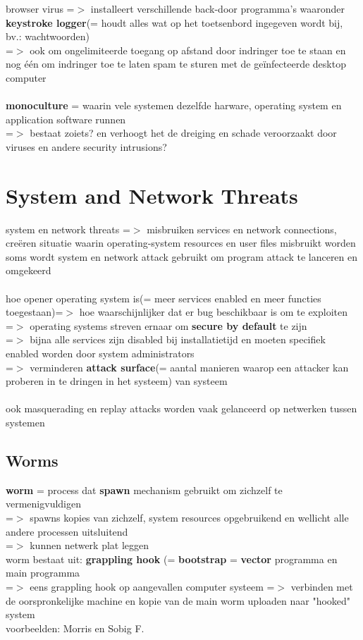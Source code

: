 \documentclass{report}
\begin{document}
browser virus =$>$ installeert verschillende back-door programma's waaronder \textbf{keystroke logger}(= houdt alles wat op het toetsenbord ingegeven wordt bij, bv.: wachtwoorden)
\\=$>$ ook om ongelimiteerde toegang op afstand door indringer toe te staan en nog \'e\'en om indringer toe te laten spam te sturen met de geïnfecteerde desktop computer
\\
\\\textbf{monoculture} = waarin vele systemen dezelfde harware, operating system en application software runnen
\\=$>$ bestaat zoiets? en verhoogt het de dreiging en schade veroorzaakt door viruses en andere security intrusions?

\section{System and Network Threats}
system en network threats =$>$ misbruiken services en network connections, cre\"eren situatie waarin operating-system resources en user files misbruikt worden
\\soms wordt system en network attack gebruikt om program attack te lanceren en omgekeerd
\\
\\hoe opener operating system is(= meer services enabled en meer functies toegestaan)=$>$ hoe waarschijnlijker dat er bug beschikbaar is om te exploiten
\\=$>$ operating systems streven ernaar om \textbf{secure by default} te zijn
\\=$>$ bijna alle services zijn disabled bij installatietijd en moeten specifiek enabled worden door system administrators
\\=$>$ verminderen \textbf{attack surface}(= aantal manieren waarop een attacker kan proberen in te dringen in het systeem) van systeem
\\
\\ook masquerading en replay attacks worden vaak gelanceerd op netwerken tussen systemen

\subsection{Worms}
\textbf{worm} = process dat \textbf{spawn} mechanism gebruikt om zichzelf te vermenigvuldigen
\\=$>$ spawns kopies van zichzelf, system resources opgebruikend en wellicht alle andere processen uitsluitend
\\=$>$ kunnen netwerk plat leggen
\\worm bestaat uit: \textbf{grappling hook} (= \textbf{bootstrap} = \textbf{vector} programma en main programma
\\=$>$ eens grappling hook op aangevallen computer systeem =$>$ verbinden met de oorspronkelijke machine en kopie van de main worm uploaden naar "hooked" system
\\voorbeelden: Morris en Sobig F.
\end{document}
